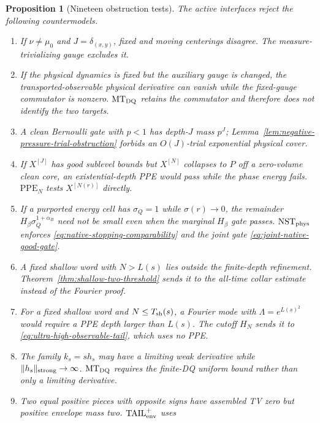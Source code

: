 \documentclass[11pt]{article}
\newtheorem{proposition}[theorem]{Proposition}
\begin{document}
\begin{proposition}[Nineteen obstruction tests]
\label{prop:v36-obstruction-tests}
The active interfaces reject the following countermodels.
\begin{enumerate}[label=\textup{(T\arabic*)}]
\item If $\nu\ne\mu_0$ and $J=\delta_{(x,y)}$, fixed and moving
      centerings disagree.  The measure-trivializing gauge excludes it.
\item If the physical dynamics is fixed but the auxiliary gauge is changed,
      the transported-observable physical derivative can vanish while the
      fixed-gauge commutator is nonzero.  $\mathrm{MT}_{\rm DQ}$ retains the
      commutator and therefore does not identify the two targets.
\item A clean Bernoulli gate with $p<1$ has depth-$J$ mass $p^J$;
      Lemma~\ref{lem:negative-pressure-trial-obstruction} forbids an
      $O(J)$-trial exponential physical cover.
\item If $X^{[J]}$ has good sublevel bounds but $X^{[N]}$ collapses to $P$
      off a zero-volume clean core, an existential-depth PPE would pass while
      the phase energy fails.  $\mathrm{PPE}_{N}$ tests $X^{[N(r)]}$
      directly.
\item If a purported energy cell has $\sigma_Q=1$ while
      $\sigma(r)\to0$, the remainder
      $H_\beta\sigma_Q^{1+\alpha_B}$ need not be small even when the
      marginal $H_\beta$ gate passes.  $\mathrm{NST}_{\rm phys}$ enforces
      \eqref{eq:native-stopping-comparability} and the joint gate
      \eqref{eq:joint-native-good-gate}.
\item A fixed shallow word with $N>L(s)$ lies outside the finite-depth
      refinement.  Theorem~\ref{thm:shallow-two-threshold} sends it to the
      all-time collar estimate instead of the Fourier proof.
\item For a fixed shallow word and $N\le T_{\rm sh}(s)$, a Fourier mode with
      $\Lambda=e^{L(s)^2}$ would require a PPE depth larger than $L(s)$.
      The cutoff $H_N$ sends it to
      \eqref{eq:ultra-high-observable-tail}, which uses no PPE.
\item The family $k_s=s h_s$ may have a limiting weak derivative while
      $\|h_s\|_{\rm strong}\to\infty$.  $\mathrm{MT}_{\rm DQ}$
      requires the finite-DQ uniform bound rather than only a limiting
      derivative.
\item Two equal positive pieces with opposite signs have assembled TV zero
      but positive envelope mass two.  $\mathrm{TAIL}_{\rm env}^{+}$ uses

\end{enumerate}
\end{proposition}
\end{document}

